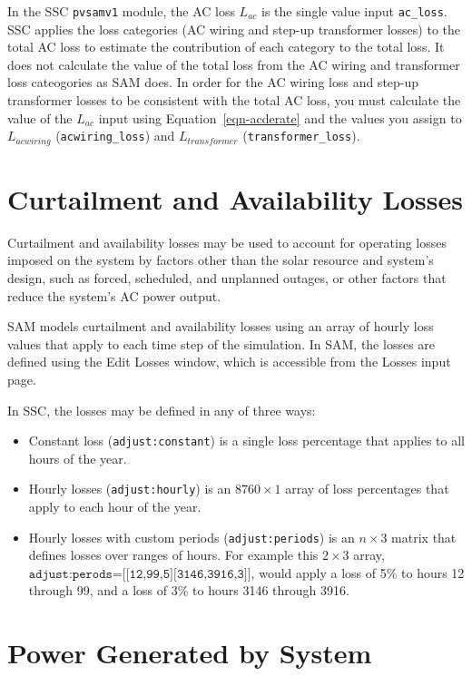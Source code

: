 \documentclass[12pt,letterpaper]{article}
\begin{document}
In the SSC \texttt{pvsamv1} module, the AC loss $L_{ac}$ is the single value input \texttt{ac\_loss}. SSC applies the loss categories (AC wiring and step-up transformer losses) to the total AC loss to estimate the contribution of each category to the total loss. It does not calculate the value of the total loss from the AC wiring and transformer loss cateogories as SAM does. In order for the AC wiring loss and step-up transformer losses to be consistent with the total AC loss, you must calculate the value of the $L_{ac}$ input using Equation~\ref{eqn-acderate} and the values you assign to $L_{\textit{acwiring}}$ (\texttt{acwiring\_loss}) and $L_{\textit{transformer}}$ (\texttt{transformer\_loss}).


\section{Curtailment and Availability Losses}

Curtailment and availability losses may be used to account for operating losses imposed on the system by factors other than the solar resource and system's design, such as forced, scheduled, and unplanned outages, or other factors that reduce the system's AC power output.

SAM models curtailment and availability losses using an array of hourly loss values that apply to each time step of the simulation. In SAM, the losses are defined using the Edit Losses window, which is accessible from the Losses input page. 

In SSC, the losses may be defined in any of three ways:

\begin{itemize}
\item Constant loss (\texttt{adjust:constant}) is a single loss percentage that applies to all hours of the year.
\item Hourly losses (\texttt{adjust:hourly}) is an $8760\times1$ array of loss percentages that apply to each hour of the year.
\item Hourly losses with custom periods (\texttt{adjust:periods}) is an $n\times3$ matrix that defines losses over ranges of hours. For example this $2\times3$ array, $\texttt{adjust:perods=[[12,99,5][3146,3916,3]]}$, would apply a loss of 5\% to hours 12 through 99, and a loss of 3\% to hours 3146 through 3916.
\end{itemize}

\section{Power Generated by System} \label{sec-hourlyenergy}
\end{document}

